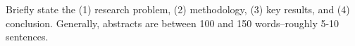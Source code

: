 \documentclass[../main.tex]{subfiles}
\begin{document}
Briefly state the (1) research problem, (2) methodology, (3) key results, and (4) conclusion. Generally, abstracts are between 100 and 150 words--roughly 5-10 sentences.
\end{document}
